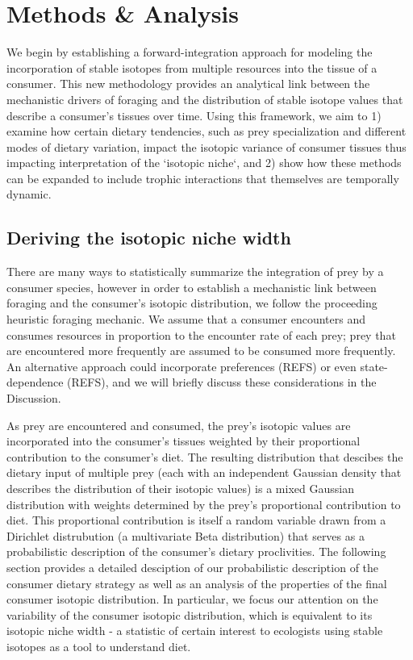 \documentclass[11pt]{article}
\begin{document}
\section{Methods \& Analysis}
We begin by establishing a forward-integration approach for modeling the incorporation of stable isotopes from multiple resources into the tissue of a consumer.
This new methodology provides an analytical link between the mechanistic drivers of foraging and the distribution of stable isotope values that describe a consumer's tissues over time.
Using this framework, we aim to
1) examine how certain dietary tendencies, such as prey specialization and different modes of dietary variation, impact the isotopic variance of consumer tissues thus impacting interpretation of the `isotopic niche`, and
2) show how these methods can be expanded to include trophic interactions that themselves are temporally dynamic.

\subsection*{Deriving the isotopic niche width}
There are many ways to statistically summarize the integration of prey by a consumer species, however in order to establish a mechanistic link between foraging and the consumer's isotopic distribution, we follow the proceeding heuristic foraging mechanic.
We assume that a consumer encounters and consumes resources in proportion to the encounter rate of each prey; prey that are encountered more frequently are assumed to be consumed more frequently.
An alternative approach could incorporate preferences (REFS) or even state-dependence (REFS), and we will briefly discuss these considerations in the Discussion.

As prey are encountered and consumed, the prey's isotopic values are incorporated into the consumer's tissues weighted by their proportional contribution to the consumer's diet.
The resulting distribution that descibes the dietary input of multiple prey (each with an independent Gaussian density that describes the distribution of their isotopic values) is a mixed Gaussian distribution with weights determined by the prey's proportional contribution to diet.
This proportional contribution is itself a random variable drawn from a Dirichlet distrubution (a multivariate Beta distribution) that serves as a probabilistic description of the consumer's dietary proclivities.
The following section provides a detailed desciption of our probabilistic description of the consumer dietary strategy as well as an analysis of the properties of the final consumer isotopic distribution.
In particular, we focus our attention on the variability of the consumer isotopic distribution, which is equivalent to its isotopic niche width - a statistic of certain interest to ecologists using stable isotopes as a tool to understand diet.
\end{document}

